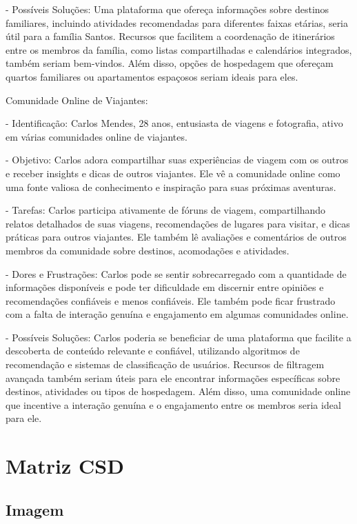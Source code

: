 \documentclass{article}
\begin{document}
- Possíveis Soluções: Uma plataforma que ofereça informações sobre destinos familiares, incluindo atividades recomendadas para diferentes faixas etárias, seria útil para a família Santos. Recursos que facilitem a coordenação de itinerários entre os membros da família, como listas compartilhadas e calendários integrados, também seriam bem-vindos. Além disso, opções de hospedagem que ofereçam quartos familiares ou apartamentos espaçosos seriam ideais para eles.

\bigskip
Comunidade Online de Viajantes:

- Identificação: Carlos Mendes, 28 anos, entusiasta de viagens e fotografia, ativo em várias comunidades online de viajantes.

- Objetivo: Carlos adora compartilhar suas experiências de viagem com os outros e receber insights e dicas de outros viajantes. Ele vê a comunidade online como uma fonte valiosa de conhecimento e inspiração para suas próximas aventuras.

- Tarefas: Carlos participa ativamente de fóruns de viagem, compartilhando relatos detalhados de suas viagens, recomendações de lugares para visitar, e dicas práticas para outros viajantes. Ele também lê avaliações e comentários de outros membros da comunidade sobre destinos, acomodações e atividades.

- Dores e Frustrações: Carlos pode se sentir sobrecarregado com a quantidade de informações disponíveis e pode ter dificuldade em discernir entre opiniões e recomendações confiáveis e menos confiáveis. Ele também pode ficar frustrado com a falta de interação genuína e engajamento em algumas comunidades online.

- Possíveis Soluções: Carlos poderia se beneficiar de uma plataforma que facilite a descoberta de conteúdo relevante e confiável, utilizando algoritmos de recomendação e sistemas de classificação de usuários. Recursos de filtragem avançada também seriam úteis para ele encontrar informações específicas sobre destinos, atividades ou tipos de hospedagem. Além disso, uma comunidade online que incentive a interação genuína e o engajamento entre os membros seria ideal para ele.

\section{Matriz CSD}
 {\subsection{Imagem}}
\end{document}
